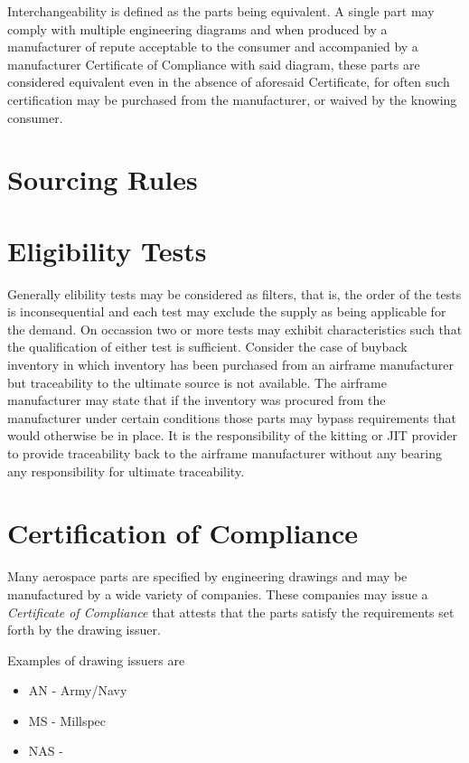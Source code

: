 \documentclass[letterpaper,10pt,english]{sphinxmanual}
\begin{document}
Interchangeability is defined as the parts being equivalent. A single
part may comply with multiple engineering diagrams and when produced by
a manufacturer of repute acceptable to the consumer and accompanied by a
manufacturer Certificate of Compliance with said diagram, these parts
are considered equivalent even in the absence of aforesaid Certificate,
for often such certification may be purchased from the manufacturer, or
waived by the knowing consumer.


\section{Sourcing Rules}
\label{APS/ApsFeatures:id3}

\section{Eligibility Tests}
\label{APS/ApsFeatures:eligibility-tests}
Generally elibility tests may be considered as filters, that is, the
order of the tests is inconsequential and each test may exclude the
supply as being applicable for the demand. On occassion two or more
tests may exhibit characteristics such that the qualification of either
test is sufficient. Consider the case of buyback inventory in which
inventory has been purchased from an airframe manufacturer but
traceability to the ultimate source is not available. The airframe
manufacturer may state that if the inventory was procured from the
manufacturer under certain conditions those parts may bypass
requirements that would otherwise be in place. It is the responsibility
of the kitting or JIT provider to provide traceability back to the
airframe manufacturer without any bearing any responsibility for
ultimate traceability.


\section{Certification of Compliance}
\label{APS/ApsFeatures:id4}
Many aerospace parts are specified by engineering drawings and may be
manufactured by a wide variety of companies. These companies may issue a
\emph{Certificate of Compliance} that attests that the parts satisfy the
requirements set forth by the drawing issuer.

Examples of drawing issuers are
\begin{itemize}
\item {} 
AN - Army/Navy

\item {} 
MS - Millspec

\item {} 
NAS -

\end{itemize}
\end{document}
